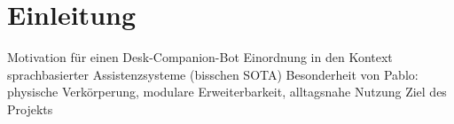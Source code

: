 \section{Einleitung}

Motivation für einen Desk-Companion-Bot
Einordnung in den Kontext sprachbasierter Assistenzsysteme (bisschen SOTA)
Besonderheit von Pablo: physische Verkörperung, modulare Erweiterbarkeit, alltagsnahe Nutzung
Ziel des Projekts

